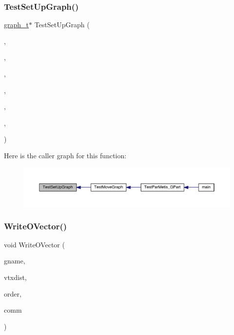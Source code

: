 \subsubsection{\texorpdfstring{Test\+Set\+Up\+Graph()}{TestSetUpGraph()}}
{\footnotesize\ttfamily \hyperlink{a00734}{graph\+\_\+t}$\ast$ Test\+Set\+Up\+Graph (\begin{DoxyParamCaption}\item[{\hyperlink{a00742}{ctrl\+\_\+t} $\ast$}]{,  }\item[{\hyperlink{a00876_aaa5262be3e700770163401acb0150f52}{idx\+\_\+t} $\ast$}]{,  }\item[{\hyperlink{a00876_aaa5262be3e700770163401acb0150f52}{idx\+\_\+t} $\ast$}]{,  }\item[{\hyperlink{a00876_aaa5262be3e700770163401acb0150f52}{idx\+\_\+t} $\ast$}]{,  }\item[{\hyperlink{a00876_aaa5262be3e700770163401acb0150f52}{idx\+\_\+t} $\ast$}]{,  }\item[{\hyperlink{a00876_aaa5262be3e700770163401acb0150f52}{idx\+\_\+t} $\ast$}]{,  }\item[{\hyperlink{a00876_aaa5262be3e700770163401acb0150f52}{idx\+\_\+t}}]{ }\end{DoxyParamCaption})}

Here is the caller graph for this function\+:\nopagebreak
\begin{figure}[H]
\begin{center}
\leavevmode
\includegraphics[width=350pt]{a00954_a7a8b23842a3717196aec03bb4b8704bd_icgraph}
\end{center}
\end{figure}
\mbox{\label{a00954_a9ff4864d8e906761bd6c55597c085e3b}} 
\subsubsection{\texorpdfstring{Write\+O\+Vector()}{WriteOVector()}}
{\footnotesize\ttfamily void Write\+O\+Vector (\begin{DoxyParamCaption}\item[{char $\ast$}]{gname,  }\item[{\hyperlink{a00876_aaa5262be3e700770163401acb0150f52}{idx\+\_\+t} $\ast$}]{vtxdist,  }\item[{\hyperlink{a00876_aaa5262be3e700770163401acb0150f52}{idx\+\_\+t} $\ast$}]{order,  }\item[{M\+P\+I\+\_\+\+Comm}]{comm }\end{DoxyParamCaption})}

